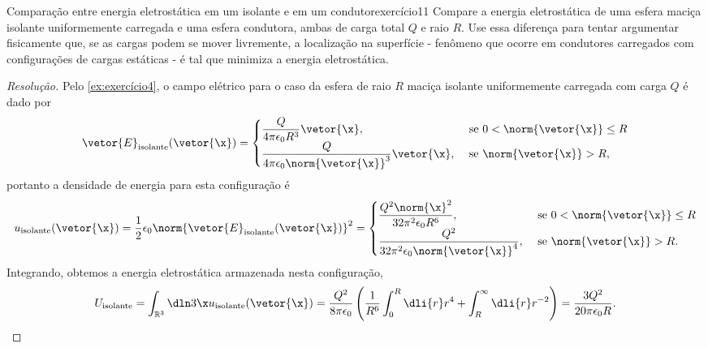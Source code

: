 \begin{exercício}{Comparação entre energia eletrostática em um isolante e em um condutor}{exercício11}
    Compare a energia eletrostática de uma esfera maciça isolante uniformemente carregada e uma esfera condutora, ambas de carga total \(Q\) e raio \(R\). Use essa diferença para tentar argumentar fisicamente que, se as cargas podem se mover livremente, a localização na superfície - fenômeno que ocorre em condutores carregados com configurações de cargas estáticas - é tal que minimiza a energia eletrostática.
\end{exercício}
\begin{proof}[Resolução]
    Pelo \cref{ex:exercício4}, o campo elétrico para o caso da esfera de raio \(R\) maciça isolante uniformemente carregada com carga \(Q\) é dado por
    \begin{equation*}
        \vetor{E}_\mathrm{isolante}(\vetor{\x}) = \begin{cases}
            \dfrac{Q}{4\pi \epsilon_0 R^3}\vetor{\x}, &\text{ se }0 < \norm{\vetor{\x}} \leq R\\
            \dfrac{Q}{4\pi\epsilon_0\norm{\vetor{\x}}^3}\vetor{\x}, &\text{ se }\norm{\vetor{\x}} > R,
        \end{cases}
    \end{equation*}
    portanto a densidade de energia para esta configuração é
    \begin{equation*}
        u_\mathrm{isolante}(\vetor{\x}) = \frac12 \epsilon_0 \norm{\vetor{E}_\mathrm{isolante}(\vetor{\x})}^2= \begin{cases}
            \dfrac{Q^2\norm{\x}^2}{32\pi^2 \epsilon_0 R^6}, &\text{ se }0 < \norm{\vetor{\x}} \leq R\\
            \dfrac{Q^2}{32\pi^2\epsilon_0\norm{\vetor{\x}}^4}, &\text{ se }\norm{\vetor{\x}} > R.
        \end{cases}
    \end{equation*}
    Integrando, obtemos a energia eletrostática armazenada nesta configuração,
    \begin{align*}
        U_\mathrm{isolante} = \int_{\mathbb{R}^3}\dln3\x u_\mathrm{isolante}(\vetor{\x}) = \frac{Q^2}{8\pi \epsilon_0} \left(\frac{1}{R^6}\int_0^R \dli{r} r^4 + \int_R^\infty \dli{r} r^{-2}\right) = \frac{3Q^2}{20\pi \epsilon_0R}.
    \end{align*}


\end{proof}
